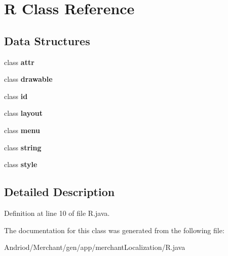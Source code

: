 \hypertarget{classapp_1_1merchant_localization_1_1_r}{\section{R Class Reference}
\label{classapp_1_1merchant_localization_1_1_r}
}
\subsection*{Data Structures}
\begin{DoxyCompactItemize}
\item 
class {\bfseries attr}
\item 
class {\bfseries drawable}
\item 
class {\bfseries id}
\item 
class {\bfseries layout}
\item 
class {\bfseries menu}
\item 
class {\bfseries string}
\item 
class {\bfseries style}
\end{DoxyCompactItemize}


\subsection{Detailed Description}


Definition at line 10 of file R.\-java.



The documentation for this class was generated from the following file\-:\begin{DoxyCompactItemize}
\item 
Andriod/\-Merchant/gen/app/merchant\-Localization/R.\-java\end{DoxyCompactItemize}
